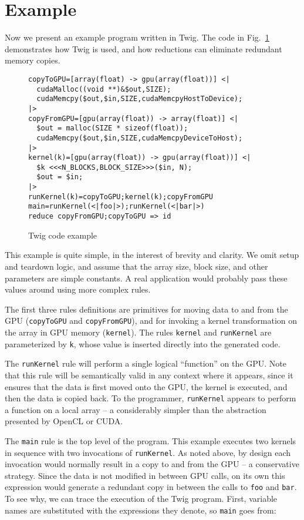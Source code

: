 
\section{Example}
\label{sec:example}

Now we present an example program written in Twig. The code in
Fig.~\ref{fig:example-code} demonstrates how Twig is used, and how
reductions can eliminate redundant memory copies.

\begin{figure}[ht]
\begin{verbatim}
copyToGPU=[array(float) -> gpu(array(float))] <|
  cudaMalloc((void **)&$out,SIZE);
  cudaMemcpy($out,$in,SIZE,cudaMemcpyHostToDevice);
|>
copyFromGPU=[gpu(array(float)) -> array(float)] <|
  $out = malloc(SIZE * sizeof(float));
  cudaMemcpy($out,$in,SIZE,cudaMemcpyDeviceToHost);
|>
kernel(k)=[gpu(array(float)) -> gpu(array(float))] <|
  $k <<<N_BLOCKS,BLOCK_SIZE>>>($in, N);
  $out = $in;
|>
runKernel(k)=copyToGPU;kernel(k);copyFromGPU
main=runKernel(<|foo|>);runKernel(<|bar|>)
reduce copyFromGPU;copyToGPU => id
\end{verbatim}
\caption{Twig code example}
\label{fig:example-code}
\end{figure}

This example is quite simple, in the interest of brevity and
clarity. We omit setup and teardown logic, and assume that the
array size, block size, and other parameters are simple constants.
A real application would probably pass these values around using
more complex rules.

The first three rules definitions are primitives for moving data
to and from the GPU (\texttt{copyToGPU} and \texttt{copyFromGPU}),
and for invoking a kernel transformation on the array in GPU
memory (\texttt{kernel}). The rules \texttt{kernel} and
\texttt{runKernel} are parameterized by \texttt{k}, whose value is
inserted directly into the generated code.

The \texttt{runKernel} rule will perform a single logical
``function'' on the GPU. Note that this rule will be semantically
valid in any context where it appears, since it ensures that the
data is first moved onto the GPU, the kernel is executed, and then
the data is copied back. To the programmer, \texttt{runKernel}
appears to perform a function on a local array -- a considerably
simpler than the abstraction presented by OpenCL or CUDA.

The \texttt{main} rule is the top level of the program. This
example executes two kernels in sequence with two invocations of
\texttt{runKernel}. As noted above, by design each invocation
would normally result in a copy to and from the GPU -- a
conservative strategy. Since the data is not modified in between
GPU calls, on its own this expression would generate a redundant
copy in between the calls to \texttt{foo} and \texttt{bar}. To see
why, we can trace the execution of the Twig program. First,
variable names are substituted with the expressions they denote,
so \texttt{main} goes from:

